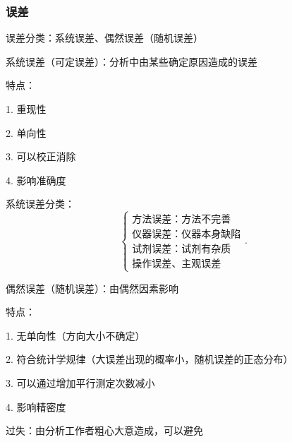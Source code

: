 \subsubsection{误差}%
\label{subsub:误差}
\begin{notation}
    误差分类：系统误差、偶然误差（随机误差）
\end{notation}
\begin{defi}
    系统误差（可定误差）：分析中由某些确定原因造成的误差

    特点：

    1. 重现性

    2. 单向性

    3. 可以校正消除

    4. 影响准确度
\end{defi}
\begin{notation}
    系统误差分类：
    \[
        \begin{cases}
            \text{方法误差：方法不完善}\\ 
            \text{仪器误差：仪器本身缺陷}\\ 
            \text{试剂误差：试剂有杂质}\\ 
            \text{操作误差、主观误差}
        \end{cases}
    .\] 
\end{notation}
\begin{defi}
    偶然误差（随机误差）：由偶然因素影响

    特点：

    1. 无单向性（方向大小不确定）

    2. 符合统计学规律（大误差出现的概率小，随机误差的正态分布）

    3. 可以通过增加平行测定次数减小

    4. 影响精密度
\end{defi}
\begin{defi}
    过失：由分析工作者粗心大意造成，可以避免
\end{defi}
